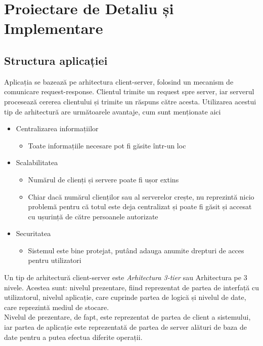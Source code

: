 \chapter{Proiectare de Detaliu și Implementare}
\pagestyle{fancy}

\section{Structura aplicației}
Aplicația se bazează pe arhitectura client-server, folosind un mecanism de comunicare request-response. Clientul trimite un request spre server, iar serverul procesează cererea clientului și trimite un răspuns către acesta.
Utilizarea acestui tip de arhitectură are următoarele avantaje, cum sunt menționate aici~\cite{CSAdvantages}
\begin{itemize}
	\setlength\itemsep{0.5em}
	\item Centralizarea informațiilor
	\begin{itemize}
		\setlength\itemsep{0.5em}
		\item Toate informațiile necesare pot fi găsite într-un loc
	\end{itemize}
	\item Scalabilitatea
	\begin{itemize}
		\setlength\itemsep{0.5em}
		\item Numărul de clienți și servere poate fi ușor extins
		\item Chiar dacă numărul clienților sau al serverelor crește, nu reprezintă nicio problemă pentru că totul este deja centralizat și poate fi găsit și accesat cu ușurință de către persoanele autorizate
	\end{itemize}
	\item Securitatea
	\begin{itemize}
		\setlength\itemsep{0.5em}
		\item Sistemul este bine protejat, putând adauga anumite drepturi de acces pentru utilizatori
	\end{itemize}
\end{itemize}

Un tip de arhitectură client-server este {\it Arhitectura 3-tier} sau Arhitectura pe 3 nivele. Acestea sunt: nivelul prezentare, fiind reprezentat de partea de interfață cu utilizatorul, nivelul aplicație,
care cuprinde partea de logică și nivelul de date, care reprezintă mediul de stocare.\\
Nivelul de prezentare, de fapt, este reprezentat de partea de client a sistemului, iar partea de aplicație este reprezentată de partea de server alături de baza de date pentru a putea efectua diferite operații.\\

